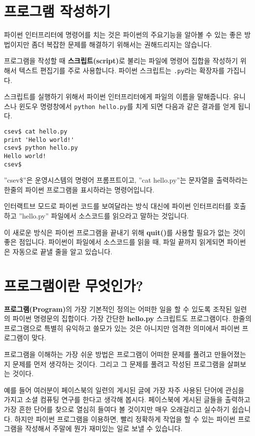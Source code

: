 \section{프로그램 작성하기}

파이썬 인터프리터에 명령어를 치는 것은 파이썬의 주요기능을 알아볼 수 있는 좋은 방법이지만 좀더 복잡한 문제를 해결하기 위해서는 권해드리지는 않습니다.

프로그램을 작성할 때 {\bf 스크립트(script)}로 불리는 파일에 명령어 집합을 작성하기 위해서 텍스트 편집기를 주로 사용합니다. 파이썬 스크립트는 {\tt .py}라는 확장자를 가집니다.


스크립트를 실행하기 위해서 파이썬 인터프리터에게 파일의 이름을 말해줍니다. 유니스나 윈도우 명령창에서 {\tt python hello.py}를 치게 되면 다음과 같은 결과를 얻게 됩니다.

\beforeverb
\begin{verbatim}
csev$ cat hello.py
print 'Hello world!'
csev$ python hello.py
Hello world!
csev$
\end{verbatim}
\afterverb
%
''csev\$''은 운영시스템의 명령어 프롬프트이고, ''cat hello.py''는 문자열을 출력하라는 한줄의 파이썬 프로그램을 표시하라는 명령어입니다.

인터랙트브 모드로 파이썬 코드를 보여달라는 방식 대신에 파이썬 인터프리터를 호출하고 ''hello.py'' 파일에서 소스코드를 읽으라고 말하는 것입니다.

이 새로운 방식은 파이썬 프로그램을 끝내기 위해 {\bf quit()}를 사용할 필요가 없는 것이 좋은 점입니다. 파이썬이 파일에서 소스코드를 읽을 때, 파일 끝까지 읽게되면 파이썬은 자동으로 끝낼 줄을 알고 있습니다.

\section{프로그램이란 무엇인가?}

{\bf 프로그램(Program)}의 가장 기본적인 정의는 어떠한 일을 할 수 있도록 조작된 일련의 파이썬 명령문의 집합이다. 가장 간단한 {\bf hello.py} 스크립트도 프로그램이다. 한줄의 프로그램으로 특별히 유익하고 쓸모가 있는 것은 아니지만 엄격한 의미에서 파이썬 프로그램이 맞다.

프로그램을 이해하는 가장 쉬운 방법은 프로그램이 어떠한 문제를 풀려고 만들어졌는지 문제를 먼저 생각하는 것이다. 그리고 그 문제를 풀려고 작성된 프로그램을 살펴보는 것이다.

예를 들어 여러분이 페이스북의 일련의 게시된 글에 가장 자주 사용된 단어에 관심을 가지고 소셜 컴퓨팅 연구를 한다고 생각해 봅시다. 페이스북에 게시된 글들을 출력하고 가장 흔한 단어를 찾으로 열심히 들여다 볼 것이지만 매우 오래걸리고 실수하기 쉽습니다. 하지만 파이썬 프로그램을 이용하면, 빨리 정확하게 작업을 할 수 있는 파이썬 프로그램을 작성해서 주말에 뭔가 재미있는 일로 보낼 수 있습니다.

